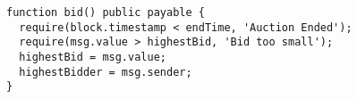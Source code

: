 \begin{lstlisting}[language=Solidity]
function bid() public payable {
  require(block.timestamp < endTime, 'Auction Ended');
  require(msg.value > highestBid, 'Bid too small');
  highestBid = msg.value;
  highestBidder = msg.sender;
}

\end{lstlisting}